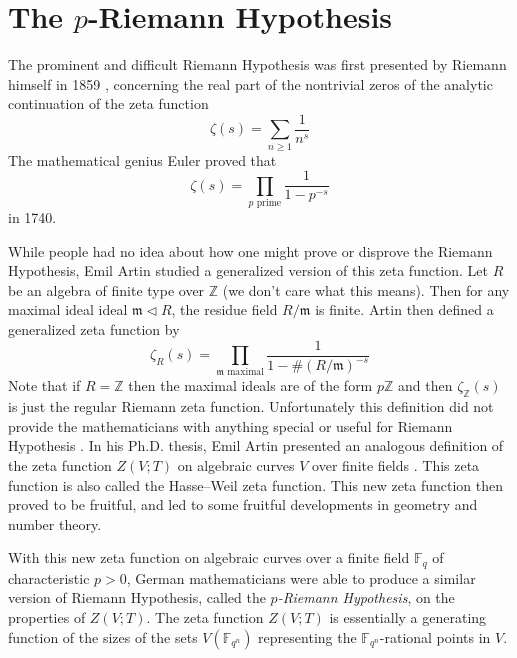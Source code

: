 \documentclass[12pt]{article}
\theoremstyle{remark}
\theoremstyle{definition}
\newcommand{\Z}[0]{\mathbb{Z}}
\newcommand{\F}[0]{\mathbb{F}}
\begin{document}
        \section{The $p$-Riemann Hypothesis}
        The prominent and difficult Riemann Hypothesis was first presented by Riemann himself in 1859 \cite{riemann_1859_ueber}, concerning the real part of the nontrivial zeros of the analytic continuation of the zeta function
        \[\zeta(s)=\sum_{n\geqslant 1}\frac{1}{n^s}\]
        The mathematical genius Euler proved that
        \[\zeta(s)=\prod_{p\text{ prime}}\frac{1}{1-p^{-s}}\]
        in 1740. 
        
        While people had no idea about how one might prove or disprove the Riemann Hypothesis, Emil Artin studied a generalized version of this zeta function. Let $R$ be an algebra of finite type over $\Z$ (we don't care what this means). Then for any maximal ideal ideal $\mathfrak m\lhd R$, the residue field $R/\mathfrak m$ is finite. Artin then defined a generalized zeta function by
        \[\zeta_R(s)=\prod_{\mathfrak m\text{ maximal}}\frac{1}{1-\#(R/\mathfrak m)^{-s}}\]
        Note that if $R=\Z$ then the maximal ideals are of the form $p\Z$ and then $\zeta_\Z(s)$ is just the regular Riemann zeta function. Unfortunately this definition did not provide the mathematicians with anything special or useful for Riemann Hypothesis \cite{oort_2014_wei}. In his Ph.D. thesis, Emil Artin presented an analogous definition of the zeta function $Z(V;T)$ on algebraic curves $V$ over finite fields \cite{Artin1924}. This zeta function is also called the Hasse–Weil zeta function. This new zeta function then proved to be fruitful, and led to some fruitful developments in geometry and number theory.
        
        With this new zeta function on algebraic curves over a finite field $\F_q$ of characteristic $p>0$, German mathematicians were able to produce a similar version of Riemann Hypothesis, called the \textit{$p$-Riemann Hypothesis}, on the properties of $Z(V;T)$. The zeta function $Z(V;T)$ is essentially a generating function of the sizes of the sets $V(\F_{q^n})$ representing the $\F_{q^n}$-rational points in $V$. 
        
\end{document}
